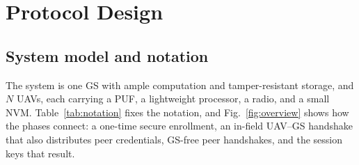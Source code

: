 \documentclass[journal]{IEEEtran}
\begin{document}
\section{Protocol Design}
\label{sec:protocol}

\subsection{System model and notation}

The system is one GS with ample computation and tamper-resistant storage, and
$N$ UAVs, each carrying a PUF, a lightweight processor, a radio, and a small
NVM. Table~\ref{tab:notation} fixes the notation, and Fig.~\ref{fig:overview}
shows how the phases connect: a one-time secure enrollment, an in-field
UAV--GS handshake that also distributes peer credentials, GS-free peer
handshakes, and the session keys that result.
\end{document}
